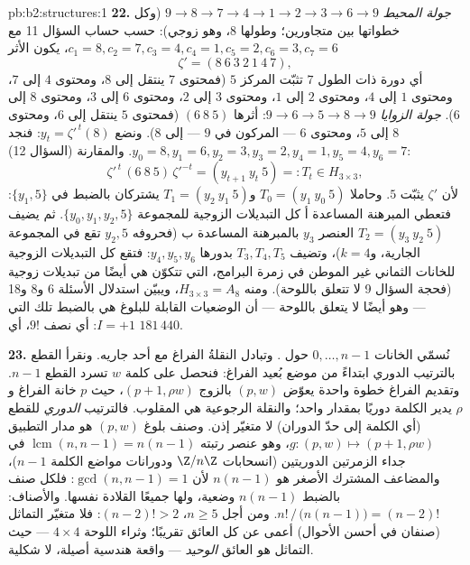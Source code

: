 \begin{solution}{pb:b2:structures:1}
\textbf{22.} \emph{جولة المحيط} $9 \to 8 \to 7 \to 4 \to 1
\to 2 \to 3 \to 6 \to 9$ (وكل خطواتها بين متجاورين؛ وطولها $8$، وهو زوجي):
حسب حساب السؤال 11 مع $c_1 = 8, c_2 = 7, c_3 =
4, c_4 = 1, c_5 = 2, c_6 = 3, c_7 = 6$، يكون الأثر
\[
\zeta' = (8\ 6\ 3\ 2\ 1\ 4\ 7),
\]
أي دورة ذات الطول $7$ تثبّت المركز $5$ (فمحتوى $7$ ينتقل إلى $8$،
ومحتوى $4$ إلى $7$، ومحتوى $1$ إلى $4$، ومحتوى $2$ إلى $1$، ومحتوى $3$ إلى $2$، ومحتوى
$6$ إلى $3$، ومحتوى $8$ إلى $6$). \emph{جولة الزوايا} $9 \to 6 \to
5 \to 8 \to 9$: أثرها $(6\ 8\ 5)$ (فمحتوى $5$ ينتقل إلى
$6$، ومحتوى $8$ إلى $5$، ومحتوى $6$ --- المركون في $9$ --- إلى $8$). ونضع
$y_t = \zeta'^{\,t}(8)$: فنجد $y_0 = 8, y_1 = 6, y_2 = 3, y_3 = 2,
y_4 = 1, y_5 = 4, y_6 = 7$. والمقارنة (السؤال 12):
\[
\zeta'^{\,t}\,(6\ 8\ 5)\,\zeta'^{-t}
= (y_{t+1}\ y_t\ 5) =: T_t \in H_{3\times3},
\]
لأن $\zeta'$ يثبّت $5$. وحاملا $T_0 = (y_1\ y_0\ 5)$
و$T_1 = (y_2\ y_1\ 5)$ يشتركان بالضبط في $\{y_1, 5\}$: فتعطي المبرهنة المساعدة أ
كل التبديلات الزوجية للمجموعة $\{y_0, y_1, y_2, 5\}$. ثم يضيف
$T_2 = (y_3\ y_2\ 5)$ العنصر $y_3$ بالمبرهنة المساعدة ب (فحروفه
$y_2, 5$ تقع في المجموعة الجارية، و$k = 4$)، وتضيف $T_3, T_4, T_5$
بدورها $y_4, y_5, y_6$: فتقع كل التبديلات الزوجية للخانات
الثماني غير الموطن في زمرة البرامج، التي تتكوّن
هي أيضًا من تبديلات زوجية (فحجة السؤال 9 لا تتعلق
باللوحة). ومنه $H_{3\times3} = A_8$، ويبيّن استدلال
الأسئلة 6 و8 و18 --- وهو أيضًا لا يتعلق باللوحة --- أن
الوضعيات القابلة للبلوغ هي بالضبط تلك التي $I = +1$: أي نصف
$9!$، أي $181\,440$.

\textbf{23.} نُسمّي الخانات $0, \dots, n-1$ حول .
وتبادل النقلةُ الفراغ مع أحد جاريه. ونقرأ
القطع بالترتيب الدوري ابتداءً من موضع بُعيد الفراغ: فنحصل على كلمة $w$
تسرد القطع $n - 1$. وتقديم الفراغ خطوة واحدة
يعوّض $(p, w)$ بالزوج $(p + 1, \rho w)$، حيث $p$ خانة
الفراغ و$\rho$ يدير الكلمة دوريًا بمقدار واحد؛ والنقلة
الرجوعية هي المقلوب. فالترتيب \emph{الدوري} للقطع (أي
الكلمة إلى حدّ الدوران) لا متغيّر إذن. وصنف بلوغ
$(p, w)$ هو مدار التطبيق $g \colon (p, w) \mapsto (p+1,
\rho w)$، وهو عنصر رتبته $\operatorname{lcm}(n, n-1) =
n(n-1)$ في جداء الزمرتين الدوريتين (انسحابات
$\Z/n\Z$ ودورانات مواضع الكلمة $n-1$)، والمضاعف المشترك الأصغر
هو $n(n-1)$ لأن $\gcd(n, n-1) = 1$: فلكل صنف
بالضبط $n(n-1)$ وضعية، ولها جميعًا القلادة نفسها.
والأصناف: $n!\,/\,\bigl(n(n-1)\bigr) = (n-2)!$. ومن أجل $n \geq 5$،
$(n-2)! > 2$: فلا متغيّر التماثل (صنفان في أحسن الأحوال)
أعمى عن كل العائق تقريبًا؛ وثراء اللوحة $4
\times 4$
--- حيث التماثل هو العائق \emph{الوحيد} ---
واقعة هندسية أصيلة، لا شكلية.


\end{solution}
